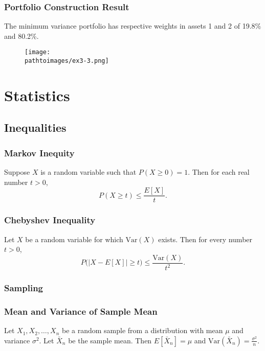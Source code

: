\documentclass{beamer}
\newcommand{\pathtoimages}{/Users/charlesrambo/Desktop/Bootcamp24/Images}
\begin{document}
\begin{frame}
\frametitle{Portfolio Construction Result}
The minimum variance portfolio has respective weights in assets 1 and 2 of 19.8\% and 80.2\%.
\begin{figure}
\centering
\texttt{[image: \\pathtoimages/ex3-3.png]}
\end{figure}
\end{frame}

\section{Statistics}



\subsection{Inequalities} 

\begin{frame}
\frametitle{Markov Inequity}

\begin{Theorem} 
Suppose $X$ is a random variable such that $P(X\geq 0) = 1$. Then for each real number $t > 0$,
$$
P(X\geq t) \leq \frac{E[X]}{t}.
$$
\end{Theorem}
\end{frame}

\begin{frame}
\frametitle{Chebyshev Inequality}

\begin{Theorem}
Let $X$ be a random variable for which $\text{Var}(X)$ exists. Then for every number $t > 0$,
$$
P\Big(\left| X - E[X]\right| \geq t\Big) \leq \frac{\text{Var}(X)}{t^2}.
$$
\end{Theorem}

\end{frame}

\frametitle{Sampling} 

\begin{frame}
\frametitle{Mean and Variance of Sample Mean}

\begin{Theorem}
Let $X_1, X_2,\ldots, X_n$ be a random sample from a distribution with mean $\mu$ and variance $\sigma^2$. Let $\bar{X}_n$ be the sample mean. Then $E[\bar{X}_n] = \mu$ and $\text{Var}(\bar{X}_n) =\frac{\sigma^2}{n}$.
\end{Theorem}
\end{frame}
\end{document}
